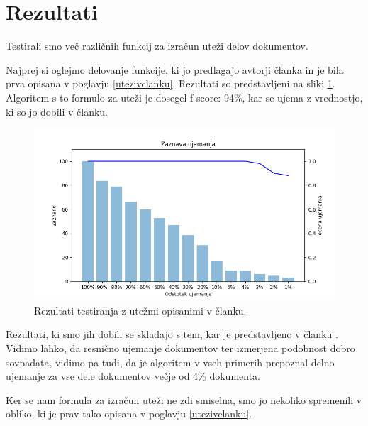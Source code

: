 \documentclass{acm_proc_article-sp}
\begin{document}
\section{Rezultati}
Testirali smo več različnih funkcij za izračun uteži delov dokumentov.

Najprej si oglejmo delovanje funkcije, ki jo predlagajo avtorji članka \cite{fbhash} in je bila prva opisana v poglavju \ref{utezivclanku}. Rezultati so predstavljeni na sliki \ref{fig:clanekUtezi}. Algoritem s to formulo za uteži je dosegel f-score: 94\%, kar se ujema z vrednostjo, ki so jo dobili v članku.
\begin{figure}[htb]
\begin{center}
\includegraphics[width=1\columnwidth]{njihov_majhen.png}
\end{center}
\caption{\small{Rezultati testiranja z utežmi opisanimi v članku.}}
\label{fig:clanekUtezi}
\end{figure}

Rezultati, ki smo jih dobili se skladajo s tem, kar je predstavljeno v članku \cite{fbhash}. Vidimo lahko, da resnično ujemanje dokumentov ter izmerjena podobnost dobro sovpadata, vidimo pa tudi, da je algoritem v vseh primerih prepoznal delno ujemanje za vse dele dokumentov večje od 4\% dokumenta.

Ker se nam formula za izračun uteži ne zdi smiselna, smo jo nekoliko spremenili v obliko, ki je prav tako opisana v poglavju \ref{utezivclanku}.
\end{document}
